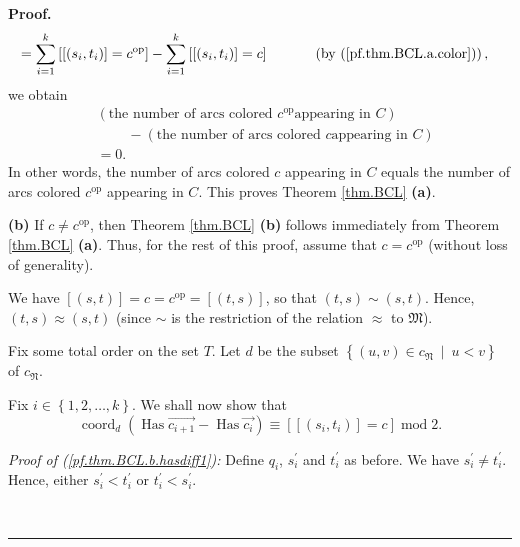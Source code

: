 \documentclass
[numbers=enddot,12pt,final,onecolumn,notitlepage,abstracton]{scrartcl}%
\theoremstyle{definition}
\newenvironment{proof}[1][Proof]{\noindent\textbf{#1.} }{\ \rule{0.5em}{0.5em}}
\let\sumnonlimits\sum
\renewcommand{\sum}{\sumnonlimits\limits}
\begin{document}
\begin{proof}
\begin{align*}
&  =\sum_{i=1}^{k}\left[  \left[  \left(  s_{i},t_{i}\right)  \right]
=c^{\operatorname*{op}}\right]  -\sum_{i=1}^{k}\left[  \left[  \left(
s_{i},t_{i}\right)  \right]  =c\right]  \ \ \ \ \ \ \ \ \ \ \left(  \text{by
(\ref{pf.thm.BCL.a.color})}\right)  ,
\end{align*}
we obtain%
\begin{align*}
&  \left(  \text{the number of arcs colored }c^{\operatorname*{op}}\text{
appearing in }C\right) \\
&  \ \ \ \ \ \ \ \ \ \ -\left(  \text{the number of arcs colored }c\text{
appearing in }C\right) \\
&  =0.
\end{align*}
In other words, the number of arcs colored $c$ appearing in $C$ equals the
number of arcs colored $c^{\operatorname*{op}}$ appearing in $C$. This proves
Theorem \ref{thm.BCL} \textbf{(a)}. \medskip

\textbf{(b)} If $c\neq c^{\operatorname*{op}}$, then Theorem \ref{thm.BCL}
\textbf{(b)} follows immediately from Theorem \ref{thm.BCL} \textbf{(a)}.
Thus, for the rest of this proof, assume that $c=c^{\operatorname*{op}}$
(without loss of generality).

We have $\left[  \left(  s,t\right)  \right]  =c=c^{\operatorname*{op}%
}=\left[  \left(  t,s\right)  \right]  $, so that $\left(  t,s\right)
\sim\left(  s,t\right)  $. Hence, $\left(  t,s\right)  \approx\left(
s,t\right)  $ (since $\sim$ is the restriction of the relation $\approx$ to
$\mathfrak{M}$).

Fix some total order on the set $T$. Let $d$ be the subset $\left\{  \left(
u,v\right)  \in c_{\mathfrak{N}}\ \mid\ u<v\right\}  $ of $c_{\mathfrak{N}}$.

Fix $i\in\left\{  1,2,\ldots,k\right\}  $. We shall now show that%
\begin{equation}
\operatorname*{coord}\nolimits_{d}\left(  \operatorname*{Has}%
\overrightarrow{c_{i+1}}-\operatorname*{Has}\overrightarrow{c_{i}}\right)
\equiv\left[  \left[  \left(  s_{i},t_{i}\right)  \right]  =c\right]
\operatorname{mod}2. \label{pf.thm.BCL.b.hasdiff1}%
\end{equation}


\textit{Proof of (\ref{pf.thm.BCL.b.hasdiff1}):} Define $q_{i}$,
$s_{i}^{\prime}$ and $t_{i}^{\prime}$ as before. We have $s_{i}^{\prime}\neq
t_{i}^{\prime}$. Hence, either $s_{i}^{\prime}<t_{i}^{\prime}$ or
$t_{i}^{\prime}<s_{i}^{\prime}$.


\end{proof}
\end{document}
